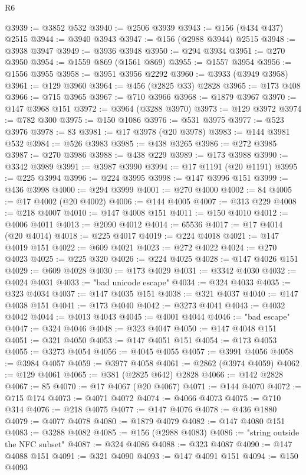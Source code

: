 \begin{lexlean}{R6}
\begin{coremodule}
@3939 := @3852 @532
@3940 := @2506 @3939
@3943 := @156 (@434 @437) @2515
@3944 := @3940 @3943
@3947 := @156 (@2988 @3944) @2515
@3948 := @3938 @3947
@3949 := @3936 @3948
@3950 := @294 @3934
@3951 := @270 @3950
@3954 := @1559 @869 (@1561 @869)
@3955 := @1557 @3954
@3956 := @1556 @3955
@3958 := @3951 @3956 @2292
@3960 := @3933 (@3949 @3958)
@3961 := @129 @3960
@3964 := @456 (@2825 @33) @2828
@3965 := @173 @408
@3966 := @715 @3965
@3967 := @710 @3966
@3968 := @1879 @3967
@3970 := @147 @3968 @151
@3972 := @3964 (@3288 @3970)
@3973 := @129 @3972
@3974 := @782 @300
@3975 := @150 @1086
@3976 := @531 @3975
@3977 := @523 @3976
@3978 := 83
@3981 := @17 @3978 (@20 @3978)
@3983 := @144 @3981 @532
@3984 := @526 @3983
@3985 := @438 @3265
@3986 := @272 @3985
@3987 := @270 @3986
@3988 := @438 @229
@3989 := @173 @3988
@3990 := @3342 @3989
@3991 := @3987 @3990
@3994 := @17 @1191 (@20 @1191)
@3995 := @225 @3994
@3996 := @224 @3995
@3998 := @147 @3996 @151
@3999 := @436 @3998
@4000 := @294 @3999
@4001 := @270 @4000
@4002 := 84
@4005 := @17 @4002 (@20 @4002)
@4006 := @144 @4005
@4007 := @313 @229
@4008 := @218 @4007
@4010 := @147 @4008 @151
@4011 := @150 @4010
@4012 := @4006 @4011
@4013 := @2090 @4012
@4014 := 65536
@4017 := @17 @4014 (@20 @4014)
@4018 := @225 @4017
@4019 := @224 @4018
@4021 := @147 @4019 @151
@4022 := @609 @4021
@4023 := @272 @4022
@4024 := @270 @4023
@4025 := @225 @320
@4026 := @224 @4025
@4028 := @147 @4026 @151
@4029 := @609 @4028
@4030 := @173 @4029
@4031 := @3342 @4030
@4032 := @4024 @4031
@4033 := "bad unicode escape"
@4034 := @324 @4033
@4035 := @323 @4034
@4037 := @147 @4035 @151
@4038 := @321 @4037
@4040 := @147 @4038 @151
@4041 := @173 @4040
@4042 := @3273 @4041
@4043 := @4032 @4042
@4044 := @4013 @4043
@4045 := @4001 @4044
@4046 := "bad escape"
@4047 := @324 @4046
@4048 := @323 @4047
@4050 := @147 @4048 @151
@4051 := @321 @4050
@4053 := @147 @4051 @151
@4054 := @173 @4053
@4055 := @3273 @4054
@4056 := @4045 @4055
@4057 := @3991 @4056
@4058 := @3984 @4057
@4059 := @3977 @4058
@4061 := @2862 (@3974 @4059)
@4062 := @129 @4061
@4065 := @381 (@2825 @642) @2828
@4066 := @142 @2828
@4067 := 85
@4070 := @17 @4067 (@20 @4067)
@4071 := @144 @4070
@4072 := @715 @174
@4073 := @4071 @4072
@4074 := @4066 @4073
@4075 := @710 @314
@4076 := @218 @4075
@4077 := @147 @4076
@4078 := @436 @1880
@4079 := @4077 @4078
@4080 := @1879 @4079
@4082 := @147 @4080 @151
@4083 := @3288 @4082
@4085 := @156 (@2988 @4083)
@4086 := "string outside the NFC subset"
@4087 := @324 @4086
@4088 := @323 @4087
@4090 := @147 @4088 @151
@4091 := @321 @4090
@4093 := @147 @4091 @151
@4094 := @150 @4093

\end{coremodule}
\end{lexlean}
